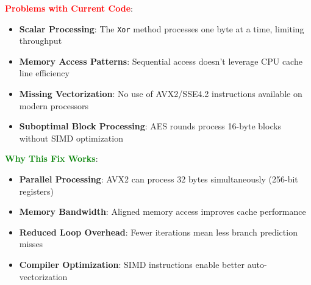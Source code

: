 \documentclass[11pt,a4paper]{article}
\begin{document}
\textcolor{red}{\textbf{Problems with Current Code}}:
\begin{itemize}
    \item \textbf{Scalar Processing}: The \texttt{Xor} method processes one byte at a time, limiting throughput
    \item \textbf{Memory Access Patterns}: Sequential access doesn't leverage CPU cache line efficiency
    \item \textbf{Missing Vectorization}: No use of AVX2/SSE4.2 instructions available on modern processors
    \item \textbf{Suboptimal Block Processing}: AES rounds process 16-byte blocks without SIMD optimization
\end{itemize}

\textcolor{green}{\textbf{Why This Fix Works}}:
\begin{itemize}
    \item \textbf{Parallel Processing}: AVX2 can process 32 bytes simultaneously (256-bit registers)
    \item \textbf{Memory Bandwidth}: Aligned memory access improves cache performance
    \item \textbf{Reduced Loop Overhead}: Fewer iterations mean less branch prediction misses
    \item \textbf{Compiler Optimization}: SIMD instructions enable better auto-vectorization
\end{itemize}
\end{document}
